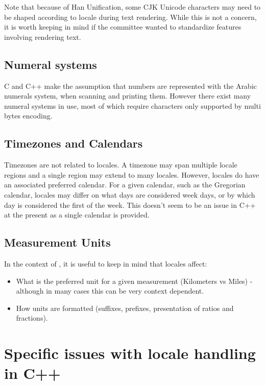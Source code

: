 \documentclass{wg21}
\begin{document}
Note that because of Han Unification, some CJK Unicode characters may need to be shaped according to locale during text rendering.
While this is not a concern, it is worth keeping in mind if the committee wanted to standardize features involving rendering text.

\subsection{Numeral systems}

C and C++ make the assumption that numbers are represented with the Arabic numerals system, when scanning and printing them.
However there exist many numeral systems in use, most of which require characters only supported by multi bytes encoding.

\subsection{Timezones and Calendars}

Timezones are not related to locales. A timezone may span multiple locale regions and a single region may extend to many locales.
However, locales do have an associated preferred calendar.
For a given calendar, such as the Gregorian calendar, locales may differ on what days are considered week days, or by which day is considered the first of the week.
This doesn't seem to be an issue in C++ at the present as a single calendar is provided.

\subsection{Measurement Units}

In the context of \cite{P1935R1}, it is useful to keep in mind that locales affect:

\begin{itemize}
\item What is the preferred unit for a given measurement (Kilometers vs Miles) - although in many cases this can be very context dependent.
\item How units are formatted (suffixes, prefixes, presentation of ratios and fractions). 
\end{itemize}

\section{Specific issues with locale handling in C++}
\end{document}
